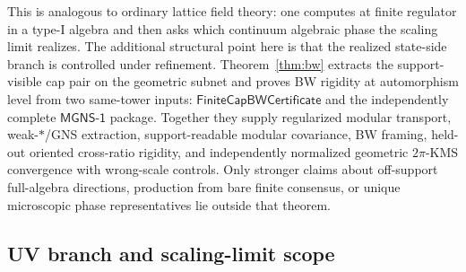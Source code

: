 \documentclass[11pt]{article}
\begin{document}
This is analogous to ordinary lattice field theory: one computes at finite regulator in a type-I algebra and then asks which continuum algebraic phase the scaling limit realizes. The additional structural point here is that the realized state-side branch is controlled under refinement. Theorem~\ref{thm:bw} extracts the support-visible cap pair on the geometric subnet and proves BW rigidity at automorphism level from two same-tower inputs: \(\mathsf{FiniteCapBWCertificate}\) and the independently complete \(\mathsf{MGNS\text{-}1}\) package. Together they supply regularized modular transport, weak-\(*\)/GNS extraction, support-readable modular covariance, BW framing, held-out oriented cross-ratio rigidity, and independently normalized geometric \(2\pi\)-KMS convergence with wrong-scale controls. Only stronger claims about off-support full-algebra directions, production from bare finite consensus, or unique microscopic phase representatives lie outside that theorem.
\subsection{UV branch and scaling-limit scope}
\end{document}
